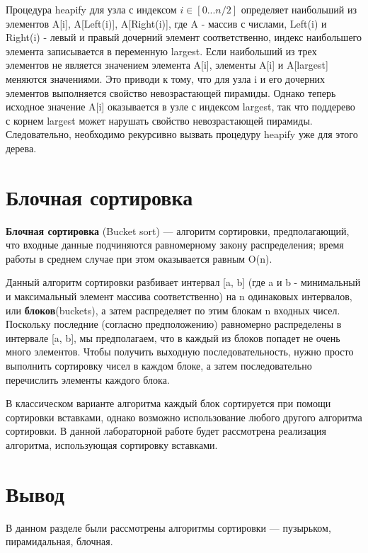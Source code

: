 Процедура heapify для узла с индексом $i \in [0...n/2]$ определяет наибольший из элементов A[i], A[Left(i)], A[Right(i)], где A - массив с числами, Left(i) и Right(i) - левый и правый дочерний элемент соответственно, индекс наибольшего элемента записывается в переменную largest. Если наибольший из трех элементов не является значением элемента A[i], элементы A[i] и A[largest] меняются значениями. Это приводи к тому, что для узла i и его дочерних элементов выполняется свойство невозрастающей пирамиды. Однако теперь исходное значение A[i] оказывается в узле с индексом largest, так что поддерево с корнем largest может нарушать свойство невозрастающей пирамиды. Следовательно, необходимо рекурсивно вызвать процедуру heapify уже для этого дерева.

\section{Блочная сортировка}
\textbf{Блочная сортировка} (Bucket sort) \cite{bucket_source} --- алгоритм сортировки, предполагающий, что входные данные подчиняются равномерному закону распределения; время работы в среднем случае при этом оказывается равным O(n). 

Данный алгоритм сортировки разбивает интервал [a, b] (где a и b - минимальный и максимальный элемент массива соответственно) на n одинаковых интервалов, или \textbf{блоков}(buckets), а затем распределяет по этим блокам n входных чисел. Поскольку последние (согласно предположению) равномерно распределены в интервале [a, b], мы предполагаем, что в каждый из блоков попадет не очень много элементов. Чтобы получить выходную последовательность, нужно просто выполнить сортировку чисел в каждом блоке, а затем последовательно перечислить элементы каждого блока.

В классическом варианте алгоритма каждый блок сортируется при помощи сортировки вставками, однако возможно использование любого другого алгоритма сортировки. В данной лабораторной работе будет рассмотрена реализация алгоритма, использующая сортировку вставками.

\section*{Вывод}
В данном разделе были рассмотрены алгоритмы сортировки --- пузырьком, пирамидальная, блочная.